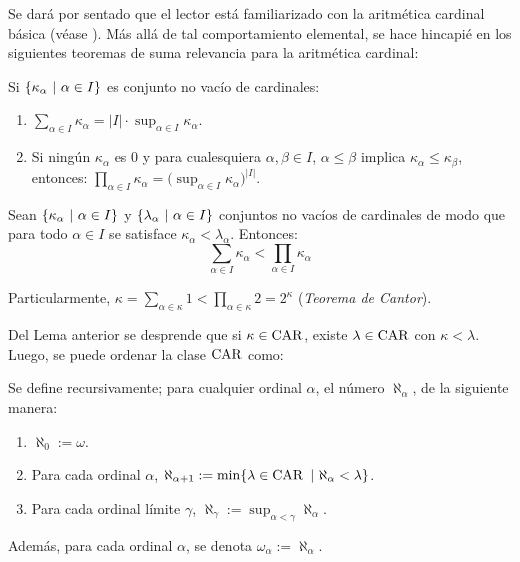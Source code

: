     Se dará por sentado que el lector está familiarizado con la aritmética cardinal básica (véase \cite[Cap.~1, \S ~ 3]{jechSet}). Más allá de tal comportamiento elemental, se hace hincapié en los siguientes teoremas de suma relevancia para la aritmética cardinal:
    \begin{teorema}
        Si $\{\kappa_\alpha \text{ $|$ } \alpha \in I\}$ es conjunto no vacío de cardinales:
        \begin{enumerate}
            \item $\displaystyle \sum_{\alpha \in I} \kappa_\alpha = |I| \cdot \sup_{\alpha \in I} \kappa_\alpha$.
            \item Si ningún $\kappa_\alpha$ es $0$ y para cualesquiera $\alpha,\beta \in I$, $\alpha \leq \beta$ implica $\kappa_\alpha \leq \kappa_\beta$, entonces: $\displaystyle \prod_{\alpha \in I} \kappa_\alpha = \Big( \sup_{\alpha \in I} \kappa_\alpha \Big)^{|I|}$.
        \end{enumerate}
    \end{teorema}

    \begin{teorema}
        Sean $\{\kappa_\alpha \text{ $|$ } \alpha \in I\}$ y $\{\lambda_\alpha \text{ $|$ } \alpha \in I\}$ conjuntos no vacíos de cardinales de modo que para todo $\alpha \in I$ se satisface $\kappa_\alpha < \lambda_\alpha$. Entonces:
        \[ \sum_{\alpha \in I} \kappa_\alpha < \prod_{\alpha \in I} \kappa_\alpha \]

        Particularmente, $\kappa = \sum_{\alpha \in \kappa} 1 < \prod_{\alpha \in \kappa} 2 = 2^\kappa$ (\textit{Teorema de Cantor}).
    \end{teorema}

    Del Lema anterior se desprende que si $\kappa \in \operatorname{CAR}$, existe $\lambda \in \operatorname{CAR}$ con $\kappa < \lambda$. Luego, se puede ordenar la clase $\operatorname{CAR}$ como:
    \begin{definicion}\index[sym]{$\aleph_\alpha$}\index[sym]{$\omega_\alpha$}
        Se define recursivamente; para cualquier ordinal $\alpha$, el número $\aleph_\alpha$, de la siguiente manera:
        \begin{enumerate}
            \item $\aleph_0:=\omega$.
            \item Para cada ordinal $\alpha$, $\aleph_{\alpha+1}:=\min\{ \lambda \in \operatorname{CAR} \text{ $|$ } \aleph_\alpha < \lambda \}$.
            \item Para cada ordinal límite $\gamma$, $\aleph_\gamma:=\sup_{\alpha < \gamma} \aleph_\alpha$.
        \end{enumerate}

        Además, para cada ordinal $\alpha$, se denota $\omega_\alpha:=\aleph_\alpha$.
    \end{definicion}

